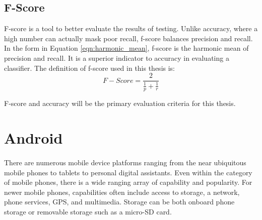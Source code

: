 	\subsection {F-Score} F-score is a tool to better evaluate the results of testing.  Unlike accuracy, where a high number can actually mask poor recall, f-score balances precision and recall. In the form in Equation \ref{eqn:harmonic_mean}, f-score is the harmonic mean of precision and recall.  It is a superior indicator to accuracy in evaluating a classifier. The definition of f-score used in this thesis is:
	\begin{equation} \label{eqn:harmonic_mean} F-Score = \frac{2}{ \frac{1}{p} + \frac{1}{r} } \end{equation}
	\begin{comment}This definition is a variant of the standard definition of:
	\begin{equation} F-Score = \frac{(\beta^2 + 1) * 2pr}{\beta^2 * (p + r)} \end{equation}
	The full definition of f-score involves an additional term, $\beta$, which is a weighting value.  A $\beta$ value greater than one favors precision and a $\beta$ value less than one favors recall.  This thesis values precision and recall equally.  This makes $\beta = 1$, thus the simpler equation for F-Score is used:
	\begin{equation} \frac{2pr}{p + r} = \frac{2}{ \frac{1}{p} + \frac{1}{r} }\end{equation} \end{comment} F-score and accuracy will be the primary evaluation criteria for this thesis.\cite{sokolova_beyond_2006}

\section{Android}  
	\paragraph{}There are numerous mobile device platforms ranging from the near ubiquitous mobile phones to tablets to personal digital assistants.  Even within the category of mobile phones, there is a wide ranging array of capability and popularity.  For newer mobile phones, capabilities often include access to storage, a network, phone services, GPS, and multimedia.  Storage can be both onboard phone storage or removable storage such as a micro-SD card.  
